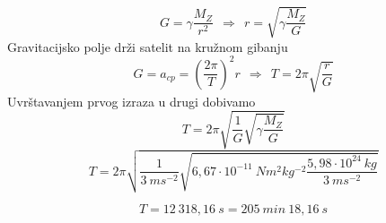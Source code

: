 

$$ G=\gamma \frac{M_Z}{r^2} \ \ \Rightarrow \ \ r=\sqrt{\gamma\frac{M_Z}{G}} $$
Gravitacijsko polje drži satelit na kružnom gibanju
$$ G= a_{cp}= \left( \frac{2\pi}{T} \right)^2 r \ \ \Rightarrow \ \  T=2\pi\sqrt{\frac{r}{G}}$$
Uvrštavanjem prvog izraza u drugi dobivamo
$$ T=2\pi\sqrt{\frac{1}{G} \sqrt{\gamma\frac{M_Z}{G}} }  $$
$$ T=2\pi\sqrt{\frac{1}{3\ ms^{-2}} \sqrt{6,67\cdot  10^{-11}\ Nm^2kg^{-2}
\frac{5,98 \cdot  10^{24}\ kg}{3\ ms^{-2}}} }  $$

$$T = 12\ 318,16\ s=205\ min\ 18,16\ s $$
